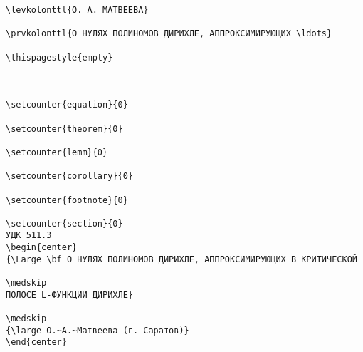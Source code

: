 \begin{verbatim}
\levkolonttl{О. А. МАТВЕЕВА}

\prvkolonttl{О НУЛЯХ ПОЛИНОМОВ ДИРИХЛЕ, АППРОКСИМИРУЮЩИХ \ldots}

\thispagestyle{empty}



\setcounter{equation}{0}

\setcounter{theorem}{0}

\setcounter{lemm}{0}

\setcounter{corollary}{0}

\setcounter{footnote}{0}

\setcounter{section}{0}
УДК 511.3
\begin{center}
{\Large \bf О НУЛЯХ ПОЛИНОМОВ ДИРИХЛЕ, АППРОКСИМИРУЮЩИХ В КРИТИЧЕСКОЙ

\medskip
ПОЛОСЕ L-ФУНКЦИИ ДИРИХЛЕ}

\medskip
{\large О.~А.~Матвеева (г. Саратов)}
\end{center}

\end{verbatim}

